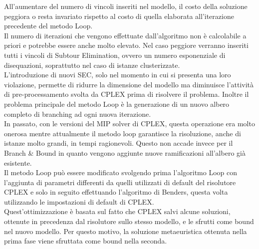 \vspace{0.5 cm}
All'aumentare del numero di vincoli inseriti nel modello, il costo della soluzione peggiora o resta invariato rispetto al costo di quella elaborata all'iterazione precedente del metodo Loop.\\
Il numero di iterazioni che vengono effettuate dall'algoritmo non è calcolabile a priori e potrebbe essere anche molto elevato. Nel caso peggiore verranno inseriti tutti i vincoli di Subtour Elimination, ovvero un numero esponenziale di disequazioni, soprattutto nel caso di istanze clusterizzate.\\
L'introduzione di nuovi SEC, solo nel momento in cui si presenta una loro violazione, permette di ridurre la dimensione del modello ma diminuisce l'attività di pre-processamento svolta da CPLEX prima di risolvere il problema. Inoltre il problema principale del metodo Loop è la generazione di un nuovo albero completo di branching ad ogni nuova iterazione.\\
In passato, con le versioni del MIP solver di CPLEX, questa operazione era molto onerosa mentre attualmente il metodo loop garantisce la risoluzione, anche di istanze molto grandi, in tempi ragionevoli. Questo non accade invece per il Branch \& Bound in quanto vengono aggiunte nuove ramificazioni all'albero già esistente.\\
Il metodo Loop può essere modificato svolgendo prima l'algoritmo Loop con l'aggiunta di parametri differenti da quelli utilizzati di default del risolutore CPLEX e solo in seguito effettuando l'algoritmo di Benders, questa volta utilizzando le impostazioni di default di CPLEX. \\
Quest'ottimizzazione è basata sul fatto che CPLEX salvi alcune soluzioni, ottenute in precedenza dal risolutore sullo stesso modello, e le sfrutti come bound nel nuovo modello. Per questo motivo, la soluzione metaeuristica ottenuta nella prima fase viene sfruttata come bound nella seconda.

